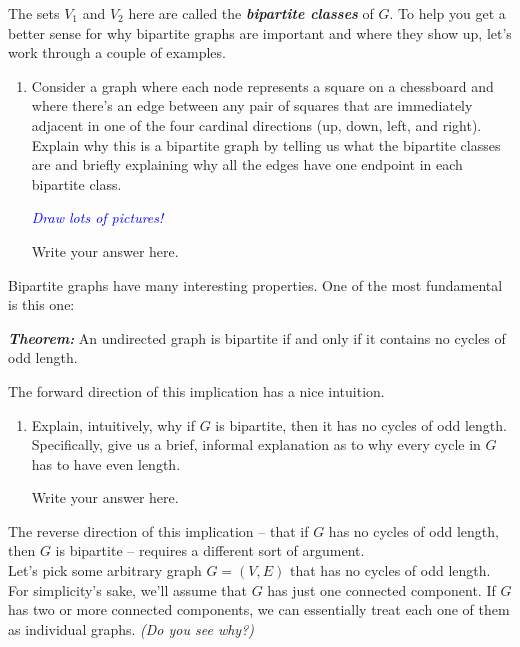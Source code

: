 \documentclass{article}
\renewcommand{\(}{\left(}
\renewcommand{\)}{\right)}
\theoremstyle{plain}
\theoremstyle{plain}
\theoremstyle{definition}
\renewcommand{\emph}[1]{\textit{\textbf{#1}}}
\newcommand{\annotate}[1]{\textit{\textcolor{blue}{#1}}}
\begin{document}
The sets $V_1$ and $V_2$ here are called the \textit{\textbf{bipartite classes}} of $G$. To help you get a better sense for why bipartite graphs are important and where they show up, let's work through a couple of examples. 

\begin{enumerate}[label=\roman*]
    \item Consider a graph where each node represents a square on a chessboard and where there's an edge between any pair of squares that are immediately adjacent in one of the four cardinal directions (up, down, left, and right). Explain why this is a bipartite graph by telling us what the bipartite classes are and briefly explaining why all the edges have one endpoint in each bipartite class.

    \annotate{Draw lots of pictures!}
    
    \begin{shaded}
    Write your answer here.
    \end{shaded}
\end{enumerate}

Bipartite graphs have many interesting properties. One of the most fundamental is this one:
\begin{center}
\emph{Theorem:} An undirected graph is bipartite if and only if it contains no cycles of odd length.
\end{center}

The forward direction of this implication has a nice intuition.

\begin{enumerate}[resume*]
    \item Explain, intuitively, why if $G$ is bipartite, then it has no cycles of odd length. Specifically, give us a brief, informal explanation as to why every cycle in $G$ has to have even length.
    
    \begin{shaded}
    Write your answer here.
    \end{shaded}
\end{enumerate}

The reverse direction of this implication -- that if $G$ has no cycles of odd length, then $G$ is bipartite -- requires a different sort of argument. \\

Let's pick some arbitrary graph $G = (V, E)$ that has no cycles of odd length. For simplicity's sake, we'll assume that $G$ has just one connected component. If $G$ has two or more connected components, we can essentially treat each one of them as individual graphs. \textit{(Do you see why?)} \\
\end{document}

